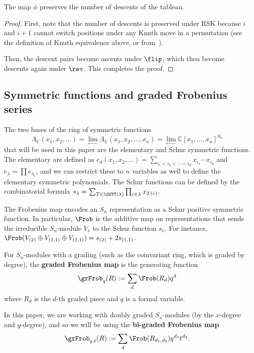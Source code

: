 \begin{lemma}
	The map $\phi$ preserves the number of descents of the tableau.
\end{lemma}

\begin{proof}
	First, note that the number of descents is preserved under RSK because $i$ and $i+1$ cannot switch positions under any Knuth move in a permutation (see the definition of Knuth equivalence above, or from~\cite{Fulton}).
	
	Then, the descent pairs become ascents under $\flip$, which then become descents again under $\rev$.  This completes the proof.
\end{proof}

\subsection{Symmetric functions and graded Frobenius series}\label{sec:Frobenius}

The two bases of the ring of symmetric functions $$\Lambda_{\mathbb{C}}(x_1,x_2,\ldots)=\lim_{\leftarrow} \Lambda_{\mathbb{C}}(x_1,x_2,\ldots,x_n)=\lim_{\leftarrow}\mathbb{C}[x_1,\ldots,x_n]^{S_n}$$ that will be used in this paper are the elementary and Schur symmetric functions.  The elementary are defined as $e_d(x_1,x_2,\ldots)=\sum_{i_1<i_2<\cdots < i_d} x_{i_1}\cdots x_{i_d}$ and $e_\lambda=\prod e_{\lambda_i}$, and we can restrict these to $n$ variables as well to define the elementary symmetric polynomials.  The Schur functions can be defined by the combinatorial formula $s_\lambda=\sum_{T\in \SSYT(\lambda)}\prod_{c \in \lambda} x_{T(c)}$.

The Frobenius map encodes an $S_n$ representation as a Schur positive symmetric function.  In particular, $\Frob$ is the additive map on representations that sends the irreducible $S_n$-module $V_\nu$ to the Schur function $s_\nu$.  For instance, $\Frob(V_{(2)}\oplus V_{(1,1)}\oplus V_{(1,1)})=s_{(2)}+2s_{(1,1)}$.

For $S_n$-modules with a grading (such as the coinvariant ring, which is graded by degree), the \textbf{graded Frobenius map} is the generating function $$\grFrob_q(R):=\sum_d \Frob(R_d)q^d$$ where $R_d$ is the $d$-th graded piece and $q$ is a formal variable.

In this paper, we are working with doubly graded $S_n$-modules (by the $x$-degree and $y$-degree), and so we will be using the \textbf{bi-graded Frobenius map} $$\grFrob_{q,t}(R):=\sum_d \Frob(R_{d_1,d_2})q^{d_1}t^{d_2}.$$

